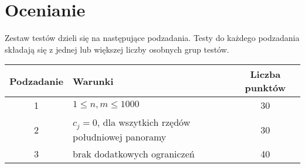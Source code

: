 \documentclass[10pt]{article}
\begin{document}
    \section*{Ocenianie}
        
    Zestaw testów dzieli się na następujące podzadania. Testy do każdego podzadania składają się z jednej lub większej liczby osobnych grup testów.
    
    \begin{center}
        \begin{tabular}{ |c|p{9cm}|c| }
            \hline
            \textbf{Podzadanie} & \textbf{Warunki} & \textbf{Liczba punktów}\\
            \hline
            1 & $1 \leq n, m \leq 1000$ & 30\\
            \hline
            2 & $c_{j} = 0$, dla wszytkich rzędów południowej panoramy & 30\\
            \hline
            3 & brak dodatkowych ograniczeń & 40\\
            \hline
        \end{tabular}
    \end{center}
\end{document}
